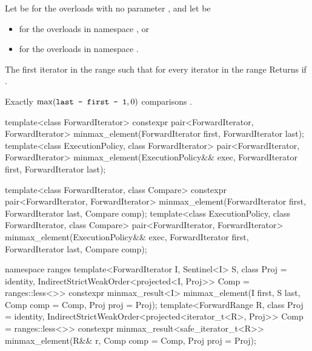 \begin{itemdescr}
\begin{addedblock}
\pnum
Let  be  for the overloads with no parameter
, and let  be
\begin{itemize}
\item {} for the overloads in namespace , or
\item {} for
  the overloads in namespace .
\end{itemize}
\end{addedblock}

\pnum
\returns
The first iterator
in the range
such that for every iterator
in the range
Returns
if
.

\pnum
\complexity
Exactly
$\max(\texttt{last - first - 1}, 0)$
 comparisons
.
\end{itemdescr}


%
\begin{itemdecl}
template<class ForwardIterator>
  constexpr pair<ForwardIterator, ForwardIterator>
    minmax_element(ForwardIterator first, ForwardIterator last);
template<class ExecutionPolicy, class ForwardIterator>
  pair<ForwardIterator, ForwardIterator>
    minmax_element(ExecutionPolicy&& exec,
                   ForwardIterator first, ForwardIterator last);

template<class ForwardIterator, class Compare>
  constexpr pair<ForwardIterator, ForwardIterator>
    minmax_element(ForwardIterator first, ForwardIterator last, Compare comp);
template<class ExecutionPolicy, class ForwardIterator, class Compare>
  pair<ForwardIterator, ForwardIterator>
    minmax_element(ExecutionPolicy&& exec,
                   ForwardIterator first, ForwardIterator last, Compare comp);
\end{itemdecl}
\begin{addedblock}
\begin{itemdecl}
namespace ranges {
  template<ForwardIterator I, Sentinel<I> S, class Proj = identity,
      IndirectStrictWeakOrder<projected<I, Proj>> Comp = ranges::less<>>
    constexpr minmax_result<I>
      minmax_element(I first, S last, Comp comp = Comp{}, Proj proj = Proj{});
  template<ForwardRange R, class Proj = identity,
      IndirectStrictWeakOrder<projected<iterator_t<R>, Proj>> Comp = ranges::less<>>
    constexpr minmax_result<safe_iterator_t<R>>
      minmax_element(R&& r, Comp comp = Comp{}, Proj proj = Proj{});
}
\end{itemdecl}
\end{addedblock}

